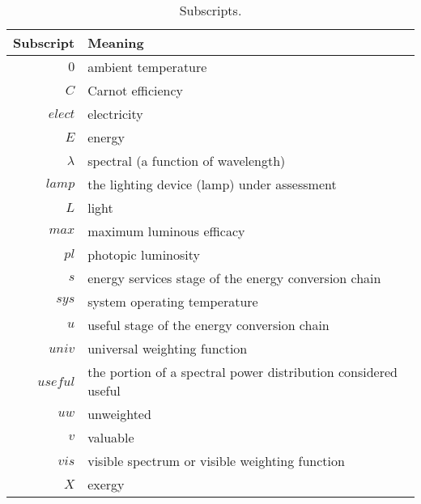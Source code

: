   


  
\begin{table}
\centering
\caption{Subscripts.}
\begin{tabular}{r l}
\toprule
Subscript & Meaning \\
\midrule
$0$ & ambient temperature \\
$C$ & Carnot efficiency \\
$elect$ & electricity \\
$E$ & energy \\
$\lambda$ & spectral (a function of wavelength) \\
$lamp$ & the lighting device (lamp) under assessment \\
$L$ & light \\
$max$ & maximum luminous efficacy \\
$pl$ & photopic luminosity \\
$s$ & energy services stage of the energy conversion chain \\
$sys$ & system operating temperature \\
$u$ & useful stage of the energy conversion chain \\
$univ$ & universal weighting function \\
$useful$ & the portion of a spectral power distribution considered useful \\
$uw$ & unweighted \\
$v$ & valuable \\
$vis$ & visible spectrum or visible weighting function \\
$X$ & exergy \\
\bottomrule
\end{tabular}
\label{tab:subscripts}
\end{table}



